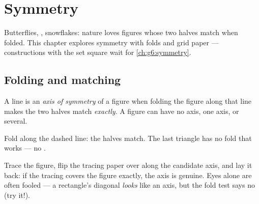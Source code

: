 \chapter{Symmetry}\label{ch:g4:symmetry}

Butterflies, , snowflakes: nature loves figures whose two halves
match when folded. This chapter explores symmetry with folds and grid
paper --- constructions with the set square wait for
\cref{ch:g6:symmetry}.

\section{Folding and matching}

\begin{definition}\label{def:g4:symmetry:def}
A line is an \emph{axis of symmetry} of a
figure when folding the figure along that line makes the two halves
match \emph{exactly}. A figure can have no axis, one axis, or
several.
\end{definition}

\begin{omfigure}

{\small Fold along the dashed line: the halves match. The last
triangle has no fold that works --- no .}
\end{omfigure}

\begin{example}\label{ex:g4:symmetry:trace}
Trace the figure, flip the tracing paper over along the candidate
axis, and lay it back: if the tracing covers the figure exactly, the
axis is genuine. Eyes alone are often fooled --- a rectangle's
diagonal \emph{looks} like an axis, but the fold test says no (try
it!).
\end{example}

